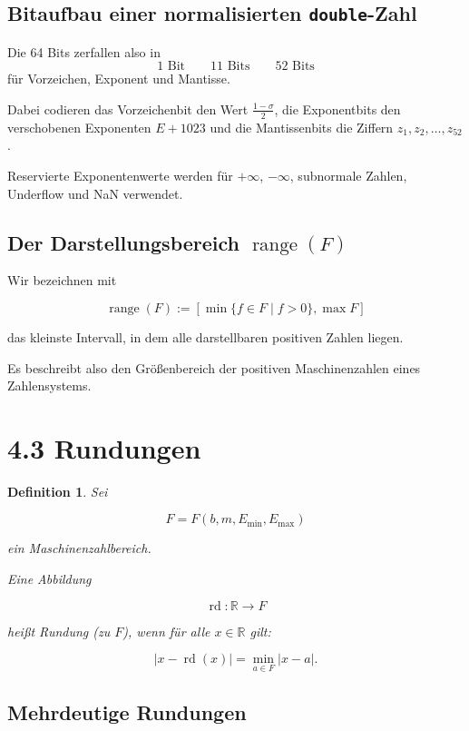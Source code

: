 \documentclass{article}
\newcommand{\R}{\mathbb{R}}%
\newtheorem{defn}[thm]{Definition}
\begin{document}
\subsection*{Bitaufbau einer normalisierten \texttt{double}-Zahl}

Die 64 Bits zerfallen also in
\[
\boxed{\text{1 Bit}}
\qquad
\boxed{\text{11 Bits}}
\qquad
\boxed{\text{52 Bits}}
\]
für Vorzeichen, Exponent und Mantisse.

Dabei codieren das Vorzeichenbit den Wert \(\frac{1-\sigma}{2}\), die Exponentbits den verschobenen Exponenten \(E+1023\) und die Mantissenbits die Ziffern \(z_1,z_2,\dots,z_{52}\).

Reservierte Exponentenwerte werden für \(+\infty\), \(-\infty\), subnormale Zahlen, Underflow und NaN verwendet.

\subsection*{Der Darstellungsbereich \(\operatorname{range}(F)\)}

Wir bezeichnen mit

\[
\operatorname{range}(F)
:=
\left[
\min\{f\in F\mid f>0\},
\max F
\right]
\]

das kleinste Intervall, in dem alle darstellbaren positiven Zahlen liegen.

Es beschreibt also den Größenbereich der positiven Maschinenzahlen eines Zahlensystems.

\section{4.3 Rundungen}

\begin{defn}
Sei

\[
F=F(b,m,E_{\min},E_{\max})
\]

ein Maschinenzahlbereich.

Eine Abbildung

\[
\operatorname{rd}:\R\to F
\]

heißt \emph{Rundung (zu \(F\))}, wenn für alle \(x\in\R\) gilt:

\[
|x-\operatorname{rd}(x)|
=
\min_{a\in F}|x-a|.
\]
\end{defn}

\subsection*{Mehrdeutige Rundungen}
\end{document}
